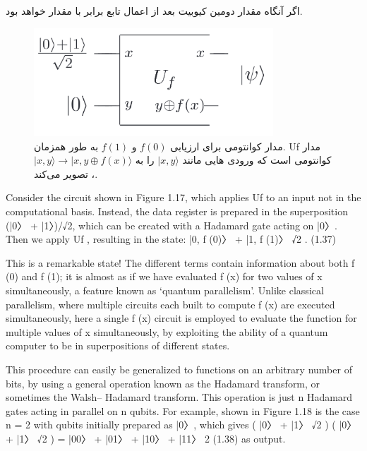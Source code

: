 \documentclass{book}
\begin{document}
اگر  آنگاه مقدار دومین کیوبیت بعد از اعمال تابع  برابر با مقدار  خواهد بود.

 \begin{center}
 	 \begin{figure}[ht]
 		\centering
 		\includegraphics[width=0.8\textwidth]{Uforacle.png}
 		\caption{مدار کوانتومی برای ارزیابی $f (0)$ و $f (1)$ به طور همزمان. Uf مدار کوانتومی است که ورودی هایی مانند $\vert x, y\rangle$ را به $\vert x, y \rangle \rightarrow \vert x, y \oplus f(x) \rangle$، تصویر می‌کند.}
 	\end{figure}
 \end{center}

 



Consider the circuit shown in Figure 1.17, which applies Uf to an input not in the
computational basis. Instead, the data register is prepared in the superposition (|0〉 +
|1〉)/√2, which can be created with a Hadamard gate acting on |0〉. Then we apply Uf ,
resulting in the state:
|0, f (0)〉 + |1, f (1)〉
√2 . (1.37)



This is a remarkable state! The different terms contain information about both f (0) and
f (1); it is almost as if we have evaluated f (x) for two values of x simultaneously, a feature
known as ‘quantum parallelism’. Unlike classical parallelism, where multiple circuits each
built to compute f (x) are executed simultaneously, here a single f (x) circuit is employed
to evaluate the function for multiple values of x simultaneously, by exploiting the ability
of a quantum computer to be in superpositions of different states.




This procedure can easily be generalized to functions on an arbitrary number of bits, by
using a general operation known as the Hadamard transform, or sometimes the Walsh–
Hadamard transform. This operation is just n Hadamard gates acting in parallel on n
qubits. For example, shown in Figure 1.18 is the case n = 2 with qubits initially prepared
as |0〉, which gives
( |0〉 + |1〉
√2
) ( |0〉 + |1〉
√2
)
= |00〉 + |01〉 + |10〉 + |11〉
2 (1.38)
as output.
\end{document}
